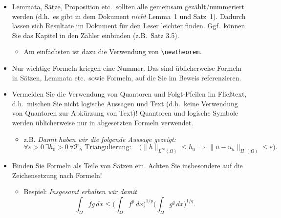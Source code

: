 \documentclass[../template_diplom.tex]{subfiles}
\begin{document}
\begin{itemize}
  \item Lemmata, Sätze, Proposition etc.\ sollten alle gemeinsam gezählt/nummeriert werden (d.h.\ es gibt in dem Dokument \emph{nicht} Lemma~1 und Satz~1). Dadurch lassen sich Resultate im Dokument für den Leser leichter finden. Ggf.\ können Sie das Kapitel in den Zähler einbinden (z.B.\ Satz 3.5).
        \begin{itemize}
          \item Am einfachsten ist dazu die Verwendung von \verb$\newtheorem$.
        \end{itemize}

  \item Nur wichtige Formeln kriegen eine Nummer. Das sind üblicherweise Formeln in Sät\-zen, Lemmata etc.\ sowie Formeln, auf die Sie im Beweis referenzieren.

  \item Vermeiden Sie die Verwendung von Quantoren und Folgt-Pfeilen im Fließtext, d.h.\ mischen Sie nicht logische Aussagen und Text (d.h.\ keine Verwendung von Quantoren zur Abkürzung von Text)! Quantoren und logische Symbole werden üblicherweise nur in abgesetzten Formeln verwendet.
        \begin{itemize}
          \item z.B. \emph{Damit haben wir die folgende Aussage gezeigt:
                  \begin{equation*}
                    \forall \varepsilon > 0 \, \exists h_0 > 0 \, \forall \mathcal{T}_h\text{ Triangulierung}:
                    \quad \Big( \| h \|_{L^\infty(\Omega)} \le h_0
                    \, \Longrightarrow \,
                    \| u - u_h \|_{H^1(\Omega)} \le \varepsilon \Big).
                  \end{equation*}}
        \end{itemize}

  \item Binden Sie Formeln als Teile von Sätzen ein. Achten Sie insbesondere auf die Zeichensetzung nach Formeln!
        \begin{itemize}
          \item Bespiel: \emph{Insgesamt erhalten wir damit
                  \begin{equation}\label{eq:hoelder}
                    \int_\Omega fg\,dx
                    \le \bigg(\int_\Omega f^p \, dx\bigg)^{1/p} \bigg(\int_\Omega g^q \, dx\bigg)^{1/q}.
                  \end{equation}}
        \end{itemize}


\end{itemize}
\end{document}

